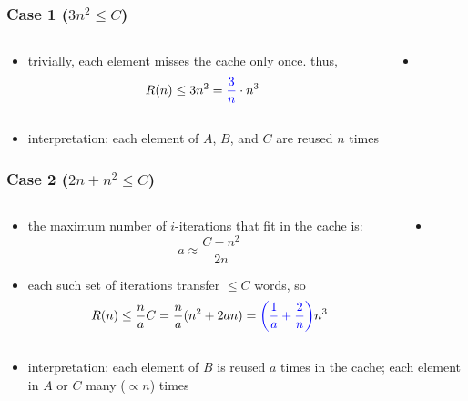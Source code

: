 \documentclass[12pt,dvipdfmx]{beamer}
\newcommand{\ao}[1]{{\color{blue}#1}}
\begin{document}
\begin{frame}[fragile]
\frametitle{Case 1 ($3n^2 \leq C$)}
\begin{columns}
  \begin{column}{0.5\textwidth}
\begin{itemize}
\item trivially, each element misses the cache only once. thus,
  \[ R(n) \leq 3n^2 = \ao{\frac{3}{n}} \cdot n^3 \]
\end{itemize}
\end{column}

\begin{column}{0.5\textwidth}
  \begin{itemize}
  \item []
{\tiny\def\svgwidth{0.9\textwidth}
}
\end{itemize}
\end{column}
\end{columns}

\begin{itemize}
\item [] 
\ao{interpretation:} each element of $A$, $B$, and $C$ are reused $n$ times
\end{itemize}
\end{frame}


\begin{frame}[fragile]
\frametitle{Case 2 ($2n + n^2 \leq C$)}
\begin{columns}
  \begin{column}{0.5\textwidth}
\begin{itemize}
\item the maximum number of $i$-iterations
  that fit in the cache is:
\[ a \approx \frac{C - n^2}{2n} \]
\item each such set of iterations transfer $\leq C$ words, so
\[ R(n) \leq \frac{n}{a} C 
= \frac{n}{a} (n^2 + 2an)
= \ao{\left(\frac{1}{a}+\frac{2}{n}\right)} n^3
\]
\end{itemize}
\end{column}

\begin{column}{0.5\textwidth}
  \begin{itemize}
  \item []
{\tiny\def\svgwidth{0.9\textwidth}
}
\end{itemize}
\end{column}
\end{columns}

\begin{itemize}
\item []
\ao{interpretation:} each element of $B$ is reused $a$ times in the cache;
each element in $A$ or $C$ many ($\propto n$) times 
\end{itemize}
\end{frame}
\end{document}

